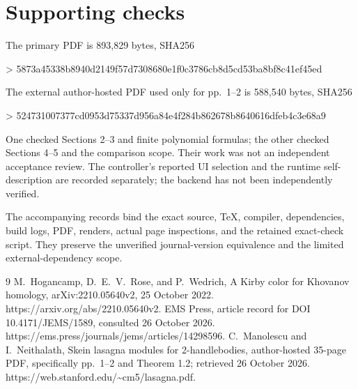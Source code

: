 \documentclass[10pt]{article}
\begin{document}
\section*{Supporting checks}
The primary PDF is 893,829 bytes, SHA256\par
> 5873a45338b8940d2149f57d7308680e1f0c3786cb8d5cd53ba8bf8c41ef45ed\par
The external author-hosted PDF used only for pp. 1–2 is 588,540 bytes, SHA256\par
> 524731007377cd0953d75337d956a84e4f284b862678b8640616dfeb4c3e68a9\par
One checked Sections 2–3 and finite polynomial formulas; the other checked Sections 4–5 and the comparison scope. Their work was not an independent acceptance review. The controller’s reported UI selection and the runtime self-description are recorded separately; the backend has not been independently verified.\par
The accompanying records bind the exact source, TeX, compiler, dependencies, build logs, PDF, renders, actual page inspections, and the retained exact-check script. They preserve the unverified journal-version equivalence and the limited external-dependency scope.\par
9 M. Hogancamp, D. E. V. Rose, and P. Wedrich, A Kirby color for Khovanov homology, arXiv:2210.05640v2, 25 October 2022. https://arxiv.org/abs/2210.05640v2. EMS Press, article record for DOI 10.4171/JEMS/1589, consulted 26 October 2026. https://ems.press/journals/jems/articles/14298596. C. Manolescu and I. Neithalath, Skein lasagna modules for 2-handlebodies, author-hosted 35-page PDF, specifically pp. 1–2 and Theorem 1.2; retrieved 26 October 2026. https://web.stanford.edu/\textasciitilde{}cm5/lasagna.pdf.\par
\end{document}
